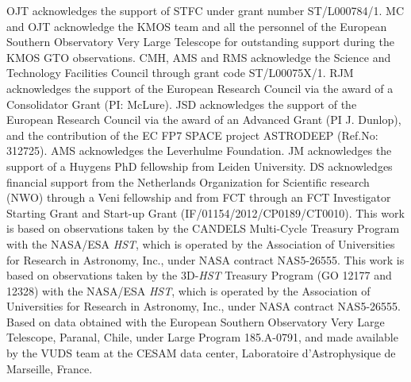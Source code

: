\documentclass[fleqn,usenatbib]{mnras}
\begin{document}
OJT acknowledges the support of STFC under grant number ST/L000784/1.
MC and OJT acknowledge the KMOS team and all the personnel of the European Southern Observatory Very Large Telescope for outstanding support during the KMOS GTO observations.
CMH, AMS and RMS acknowledge the Science and Technology Facilities Council through grant code ST/L00075X/1.
RJM acknowledges the support of the European Research Council via the award of a Consolidator Grant (PI: McLure).
JSD acknowledges the support of the European Research Council via the award of an Advanced Grant (PI J. Dunlop), and the contribution of the EC FP7 SPACE project ASTRODEEP (Ref.No: 312725).
AMS acknowledges the Leverhulme Foundation.
JM acknowledges the support of a Huygens PhD fellowship from Leiden University. DS acknowledges financial support from the Netherlands Organization for Scientific research (NWO) through a Veni fellowship and from FCT through an FCT Investigator Starting Grant and Start-up Grant (IF/01154/2012/CP0189/CT0010).
This work is based on observations taken by the CANDELS Multi-Cycle Treasury Program with the NASA/ESA {\em HST}, which is operated by the Association of Universities for Research in Astronomy, Inc., under NASA contract NAS5-26555.
This work is based on observations taken by the 3D-{\em HST} Treasury Program (GO 12177 and 12328) with the NASA/ESA {\em HST}, which is operated by the Association of Universities for Research in Astronomy, Inc., under NASA contract NAS5-26555.
Based on data obtained with the European Southern Observatory Very Large Telescope, Paranal, Chile, under Large Program 185.A-0791, and made available by the VUDS team at the CESAM data center, Laboratoire d'Astrophysique de Marseille, France.





%


\clearpage 

%

\clearpage

\end{document}

